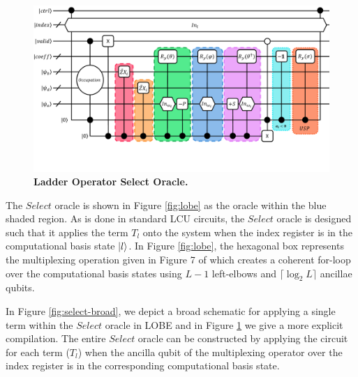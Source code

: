 \begin{figure}
    \centering
    \includegraphics[width=16cm]{figures/select-specific.pdf}
    \caption{\textbf{Ladder Operator Select Oracle.}
    }
    \label{fig:select-specific}
\end{figure}

The $Select$ oracle is shown in Figure \ref{fig:lobe} as the oracle within the blue shaded region.
As is done in standard LCU circuits, the $Select$ oracle is designed such that it applies the term $T_l$ onto the system when the index register is in the computational basis state $\ket{l}$.
In Figure \ref{fig:lobe}, the hexagonal box represents the multiplexing operation given in Figure 7 of \cite{babbush2018encoding} which creates a coherent for-loop over the computational basis states using $L - 1$ left-elbows and $\lceil \log_2{L} \rceil$ ancillae qubits.

In Figure \ref{fig:select-broad}, we depict a broad schematic for applying a single term within the $Select$ oracle in LOBE and in Figure \ref{fig:select-specific} we give a more explicit compilation.
The entire $Select$ oracle can be constructed by applying the circuit for each term ($T_l$) when the ancilla qubit of the multiplexing operator over the index register is in the corresponding computational basis state.

